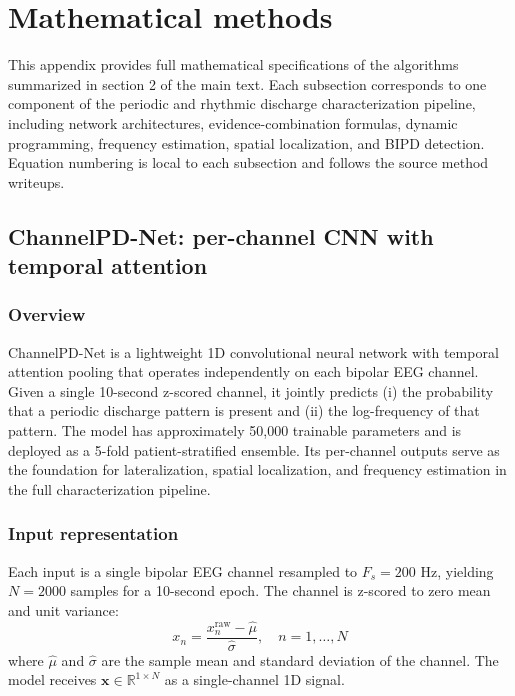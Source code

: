 \section{Mathematical methods}
\label{app:math_methods}

This appendix provides full mathematical specifications of the algorithms summarized in section 2 of the main text. Each subsection corresponds to one component of the periodic and rhythmic discharge characterization pipeline, including network architectures, evidence-combination formulas, dynamic programming, frequency estimation, spatial localization, and BIPD detection. Equation numbering is local to each subsection and follows the source method writeups.

\subsection{ChannelPD-Net: per-channel CNN with temporal attention}
\label{app:channelpdnet}

\subsubsection{Overview}

ChannelPD-Net is a lightweight 1D convolutional neural network with temporal attention pooling that operates independently on each bipolar EEG channel. Given a single 10-second z-scored channel, it jointly predicts (i) the probability that a periodic discharge pattern is present and (ii) the log-frequency of that pattern. The model has approximately 50,000 trainable parameters and is deployed as a 5-fold patient-stratified ensemble. Its per-channel outputs serve as the foundation for lateralization, spatial localization, and frequency estimation in the full characterization pipeline.

\subsubsection{Input representation}

Each input is a single bipolar EEG channel resampled to $F_s = 200$ Hz, yielding $N = 2000$ samples for a 10-second epoch. The channel is z-scored to zero mean and unit variance:
\[ x_n = \frac{x_n^{\mathrm{raw}} - \hat{\mu}}{\hat{\sigma}}, \quad n = 1, \ldots, N \tag{1} \]
where $\hat{\mu}$ and $\hat{\sigma}$ are the sample mean and standard deviation of the channel. The model receives $\mathbf{x} \in \mathbb{R}^{1 \times N}$ as a single-channel 1D signal.


